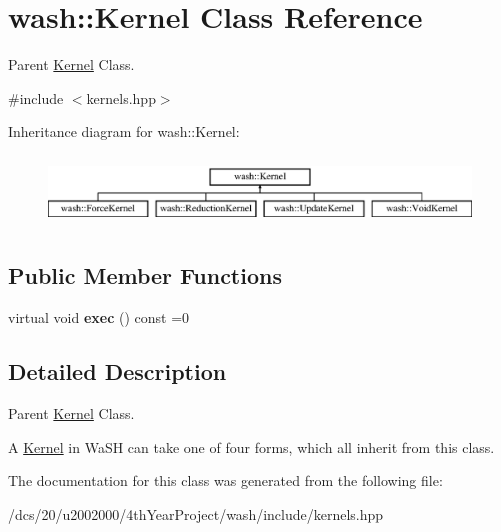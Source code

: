 \hypertarget{classwash_1_1Kernel}{}\section{wash\+:\+:Kernel Class Reference}
\label{classwash_1_1Kernel}


Parent \mbox{\hyperlink{classwash_1_1Kernel}{Kernel}} Class.  




{\ttfamily \#include $<$kernels.\+hpp$>$}

Inheritance diagram for wash\+:\+:Kernel\+:\begin{figure}[H]
\begin{center}
\leavevmode
\includegraphics[height=1.891892cm]{classwash_1_1Kernel}
\end{center}
\end{figure}
\subsection*{Public Member Functions}
\begin{DoxyCompactItemize}
\item 
\mbox{\label{classwash_1_1Kernel_a0ec211840402ce975997b22136f16e39}} 
virtual void {\bfseries exec} () const =0
\end{DoxyCompactItemize}


\subsection{Detailed Description}
Parent \mbox{\hyperlink{classwash_1_1Kernel}{Kernel}} Class. 

A \mbox{\hyperlink{classwash_1_1Kernel}{Kernel}} in Wa\+SH can take one of four forms, which all inherit from this class. 

The documentation for this class was generated from the following file\+:\begin{DoxyCompactItemize}
\item 
/dcs/20/u2002000/4th\+Year\+Project/wash/include/kernels.\+hpp\end{DoxyCompactItemize}
